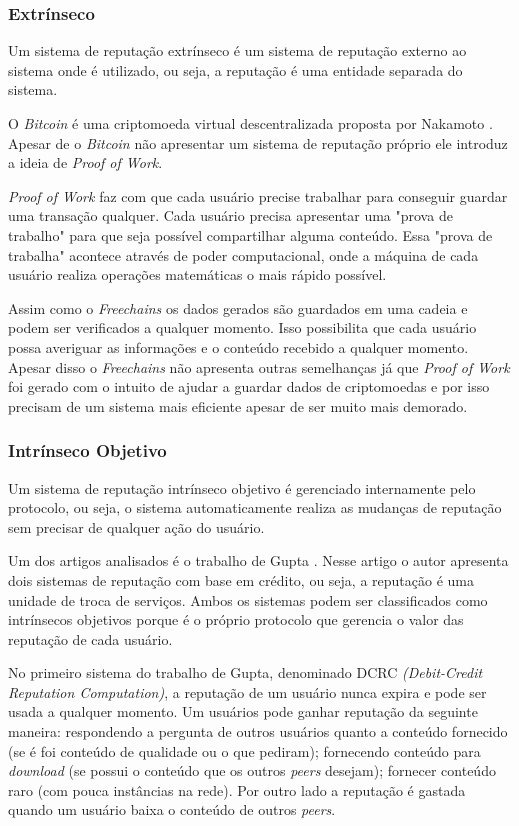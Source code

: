 \documentclass[12pt]{article}
\newcommand{\FC} {\emph{Freechains}\xspace}
\begin{document}
\subsubsection{Extrínseco} \label{subsub:extr}

Um sistema de reputação extrínseco é um sistema de reputação externo ao sistema onde é utilizado, ou seja, a reputação é uma entidade separada do sistema.

O \emph{Bitcoin} é uma criptomoeda virtual descentralizada proposta por Nakamoto \cite{nakamoto2008peer}. Apesar de o \emph{Bitcoin} não apresentar um sistema de reputação próprio ele introduz a ideia de \emph{Proof of Work}. 

\emph{Proof of Work} faz com que cada usuário precise trabalhar para conseguir guardar uma transação qualquer. Cada usuário precisa apresentar uma "prova de trabalho" para que seja possível compartilhar alguma conteúdo. Essa "prova de trabalha" acontece através de poder computacional, onde a máquina de cada usuário realiza operações matemáticas o mais rápido possível.

Assim como o \FC os dados gerados são guardados em uma cadeia e podem ser verificados a qualquer momento. Isso possibilita que cada usuário possa averiguar as informações e o conteúdo recebido a qualquer momento. Apesar disso o \FC não apresenta outras semelhanças já que \emph{Proof of Work} foi gerado com o intuito de ajudar a guardar dados de criptomoedas e por isso precisam de um sistema mais eficiente apesar de ser muito mais demorado.

\subsubsection{Intrínseco Objetivo} \label{subsub:intobj}

Um sistema de reputação intrínseco objetivo é gerenciado internamente pelo protocolo, ou seja, o sistema automaticamente realiza as mudanças de reputação sem precisar de qualquer ação do usuário. 

Um dos artigos analisados é o trabalho de Gupta \cite{gupta2003reputation}. Nesse artigo o autor apresenta dois  sistemas de reputação com base em crédito, ou seja, a reputação é uma unidade de troca de serviços. Ambos os sistemas podem ser classificados como intrínsecos objetivos porque é o próprio protocolo que gerencia o valor das reputação de cada usuário.

No primeiro sistema do trabalho de Gupta, denominado DCRC \emph{(Debit-Credit Reputation Computation)}, a reputação de um usuário nunca expira e pode ser usada a qualquer momento. Um usuários pode ganhar reputação da seguinte maneira: respondendo a pergunta de outros usuários quanto a conteúdo fornecido (se é foi conteúdo de qualidade ou o que pediram); fornecendo conteúdo para \emph{download} (se possui o conteúdo que os outros \emph{peers} desejam); fornecer conteúdo raro (com pouca instâncias na rede). Por outro lado a reputação é gastada quando um usuário baixa o conteúdo de outros \emph{peers}.
\end{document}
